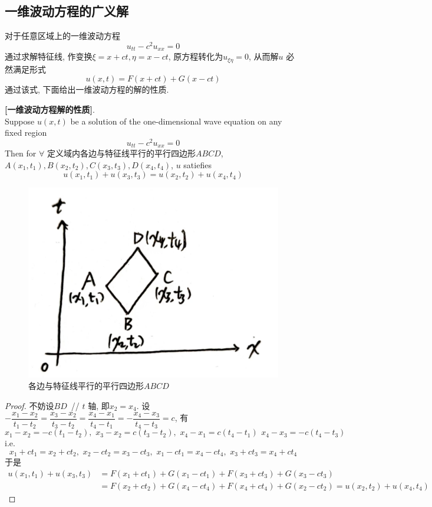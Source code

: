 \newpage

\subsection{一维波动方程的广义解}
	对于任意区域上的一维波动方程
	\[ u_{tt} - c^2 u_{xx} = 0 \]
	通过求解特征线, 作变换$\xi = x + ct , \eta = x - ct$, 原方程转化为$u_{\xi\eta} = 0$, 从而解$u$ 必然满足形式
	\[ u(x , t) = F(x + ct) + G(x - ct) \]
	通过该式, 下面给出一维波动方程的解的性质. 
	
	\vspace*{2.5em}
	
	\begin{proposition}\label{prop 2.3.1}
		\textbf{[一维波动方程解的性质]}. \\
		Suppose $u(x , t)$ be a solution of the one-dimensional wave equation on any fixed region
		\[ u_{tt} - c^2 u_{xx} = 0 \]
		Then for $\forall$ 定义域内各边与特征线平行的平行四边形$ABCD$, $A(x_1 , t_1) , B(x_2 , t_2) , C(x_3 , t_3) , D(x_4 , t_4)$, $u$ satiefies 
		\[ u(x_1 , t_1) + u(x_3 , t_3) = u(x_2 , t_2) + u(x_4 , t_4) \]
		
		\begin{figure}[thbp!]
			\centering
			\includegraphics[width=0.3\linewidth]{figure/2.3-8}
			\caption{各边与特征线平行的平行四边形$ABCD$}
			\label{pic : 2.3-8} %
		\end{figure}
		
		\begin{proof}
			不妨设$BD \,$ // $t$ 轴, 即$x_2 = x_4$. 设$-\dfrac{x_1 - x_2}{t_1 - t_2} = \dfrac{x_3 - x_2}{t_3 - t_2} = \dfrac{x_4 - x_1}{t_4 - t_1} = -\dfrac{x_4 - x_3}{t_4 - t_3} = c$, 有
			\[ x_1 - x_2 = -c(t_1 - t_2) , \,\, x_3 - x_2 = c(t_3 - t_2) , \,\, x_4 - x_1 = c(t_4 - t_1) \,\ x_4 - x_3 = -c(t_4 - t_3) \]
			i.e.
			\[ x_1 + ct_1 = x_2 + ct_2 , \,\, x_2 - ct_2 = x_3 - ct_3 , \,\, x_1 - ct_1 = x_4 - ct_4 , \,\, x_3 + ct_3 = x_4 + ct_4 \]
			于是
			\begin{align*}
				u(x_1 , t_1) + u(x_3 , t_3) 
				&= F(x_1 + ct_1) + G(x_1 - ct_1) + F(x_3 + ct_3) + G(x_3 - ct_3) \\
				&= F(x_2 + ct_2) + G(x_4 - ct_4) + F(x_4 + ct_4) + G(x_2 - ct_2) 
				= u(x_2 , t_2) + u(x_4 , t_4)
			\end{align*}
		\end{proof}
	\end{proposition}
	
